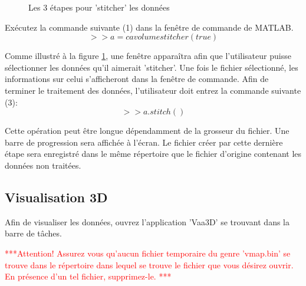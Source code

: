 \begin{figure}[H]
    \centering
    \qquad
    \caption{Les 3 étapes pour 'stitcher' les données}%
    \label{fig:cmd}%
\end{figure}

Exécutez la commande suivante (1) dans la fenêtre de commande de MATLAB.
$$>>a = cavolumestitcher(true) $$

Comme illustré à la figure \ref{fig:cmd}, une fenêtre apparaîtra afin que l'utilisateur puisse sélectionner  les données qu'il aimerait 'stitcher'. Une fois le fichier sélectionné, les informations sur celui s'afficheront dans la fenêtre de commande. Afin de terminer le traitement des données, l'utilisateur doit entrez la commande suivante (3):
$$>>a.stitch()$$

Cette opération peut être longue dépendamment de la grosseur du fichier. Une barre de progression sera affichée à l'écran. Le fichier créer par cette dernière étape sera enregistré dans le même répertoire que le fichier d'origine contenant les données non traitées.

\subsection{Visualisation 3D}
Afin de visualiser les données, ouvrez l'application 'Vaa3D' se trouvant dans la barre de tâches.

\begin{center}\textcolor{red}{***Attention! Assurez vous qu'aucun fichier temporaire du genre 'vmap.bin' se trouve dans le répertoire dans lequel se trouve le fichier que vous désirez ouvrir. En présence d'un tel fichier, supprimez-le. ***}\end{center}


